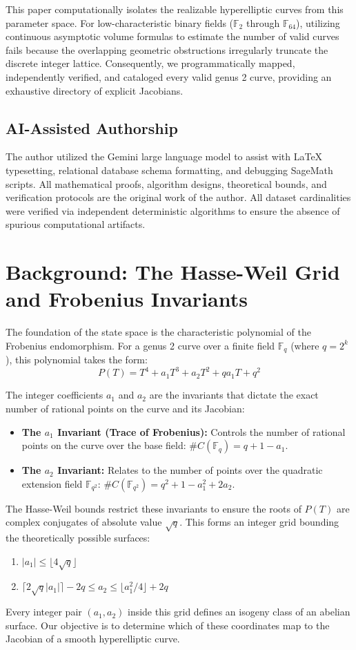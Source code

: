 \documentclass[12pt]{article}
\begin{document}
This paper computationally isolates the realizable hyperelliptic curves from this parameter space. For low-characteristic binary fields ($\mathbb{F}_2$ through $\mathbb{F}_{64}$), utilizing continuous asymptotic volume formulas to estimate the number of valid curves fails because the overlapping geometric obstructions irregularly truncate the discrete integer lattice. Consequently, we programmatically mapped, independently verified, and cataloged every valid genus 2 curve, providing an exhaustive directory of explicit Jacobians.

\subsection{AI-Assisted Authorship}
The author utilized the Gemini large language model \cite{Gemini2026} to assist with \LaTeX{} typesetting, relational database schema formatting, and debugging SageMath scripts. All mathematical proofs, algorithm designs, theoretical bounds, and verification protocols are the original work of the author. All dataset cardinalities were verified via independent deterministic algorithms to ensure the absence of spurious computational artifacts.

\section{Background: The Hasse-Weil Grid and Frobenius Invariants}
The foundation of the state space is the characteristic polynomial of the Frobenius endomorphism. For a genus 2 curve over a finite field $\mathbb{F}_q$ (where $q = 2^k$), this polynomial takes the form:
\[ P(T) = T^4 + a_1 T^3 + a_2 T^2 + q a_1 T + q^2 \]

The integer coefficients $a_1$ and $a_2$ are the invariants that dictate the exact number of rational points on the curve and its Jacobian:
\begin{itemize}
    \item \textbf{The $a_1$ Invariant (Trace of Frobenius):} Controls the number of rational points on the curve over the base field: $\#C(\mathbb{F}_q) = q + 1 - a_1$.
    \item \textbf{The $a_2$ Invariant:} Relates to the number of points over the quadratic extension field $\mathbb{F}_{q^2}$: $\#C(\mathbb{F}_{q^2}) = q^2 + 1 - a_1^2 + 2a_2$.
\end{itemize}

The Hasse-Weil bounds restrict these invariants to ensure the roots of $P(T)$ are complex conjugates of absolute value $\sqrt{q}$. This forms an integer grid bounding the theoretically possible surfaces:
\begin{enumerate}
    \item $|a_1| \le \lfloor 4\sqrt{q} \rfloor$
    \item $\lceil 2\sqrt{q}|a_1| \rceil - 2q \le a_2 \le \lfloor a_1^2/4 \rfloor + 2q$
\end{enumerate}
Every integer pair $(a_1, a_2)$ inside this grid defines an isogeny class of an abelian surface. Our objective is to determine which of these coordinates map to the Jacobian of a smooth hyperelliptic curve.
\end{document}
